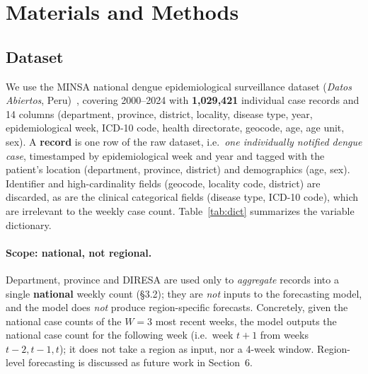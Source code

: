\documentclass[runningheads]{llncs}
\begin{document}
\section{Materials and Methods}

\subsection{Dataset}
We use the MINSA national dengue epidemiological surveillance dataset (\emph{Datos
Abiertos}, Peru)~\cite{minsa}, covering 2000--2024 with \textbf{1{,}029{,}421}
individual case records and 14 columns
(department, province, district, locality, disease type, year, epidemiological week,
ICD-10 code, health directorate, geocode, age, age unit, sex). A \textbf{record} is one row
of the raw dataset, i.e.\ \emph{one individually notified dengue case}, timestamped by
epidemiological week and year and tagged with the patient's location (department, province,
district) and demographics (age, sex). Identifier and
high-cardinality fields (geocode, locality code, district) are discarded, as are the
clinical categorical fields (disease type, ICD-10 code), which are irrelevant to the weekly
case count. Table~\ref{tab:dict} summarizes the variable dictionary.

\paragraph{Scope: national, not regional.} Department, province and DIRESA are used only to
\emph{aggregate} records into a single \textbf{national} weekly count (\S3.2); they are
\emph{not} inputs to the forecasting model, and the model does \emph{not} produce
region-specific forecasts. Concretely, given the national case counts of the $W=3$ most
recent weeks, the model outputs the national case count for the following week (i.e.\ week
$t{+}1$ from weeks $t{-}2,t{-}1,t$); it does not take a region as input, nor a 4-week
window. Region-level forecasting is discussed as future work in Section~6.
\end{document}
